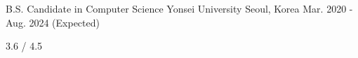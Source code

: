 


\begin{cventries}


\cventry
{B.S. Candidate in Computer Science} %
{Yonsei University} %
{Seoul, Korea} %
{Mar. 2020 - Aug. 2024 (Expected)} %
{ %
\begin{cvitems}
\item {3.6 / 4.5}
\end{cvitems}
}


\end{cventries}